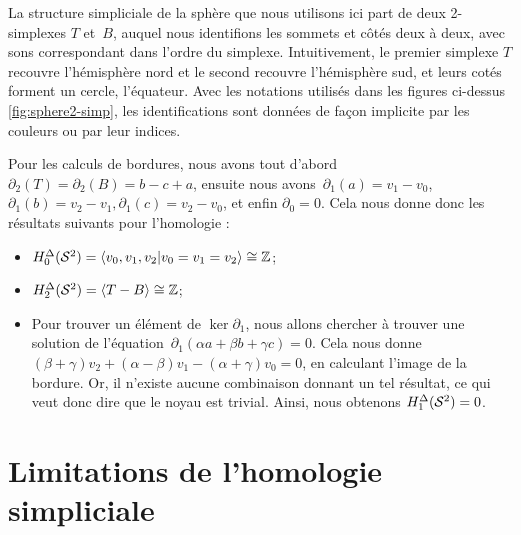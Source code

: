 \begin{exemple}
La structure simpliciale de la sphère que nous utilisons ici part de deux 2-simplexes $T$ et~$B$, auquel nous identifions les sommets et côtés deux à deux, avec sons correspondant dans l'ordre du simplexe. Intuitivement, le premier simplexe $T$ recouvre l'hémisphère nord et le second recouvre l'hémisphère sud, et leurs cotés forment un cercle, l'équateur. Avec les notations utilisés dans les figures ci-dessus \ref{fig:sphere2-simp}, les identifications sont données de façon implicite par les couleurs ou par leur indices.

Pour les calculs de bordures, nous avons tout d'abord $\partial_2(T)=\partial_2(B)=b-c+a$, ensuite nous avons~${\partial_1(a)=v_1-v_0}$, $\partial_1(b)=v_2-v_1,\partial_1(c)=v_2-v_0$, et enfin $\partial_0=0$. Cela nous donne donc les résultats suivants pour l'homologie :
\begin{itemize}
    \item $H^\Delta_0(\mathcal{S}^{2})=\langle v_0,v_1,v_2|v_0=v_1=v_2\rangle\cong\mathbb{Z}$;
    \item $H^\Delta_2(\mathcal{S}^{2})=\langle T-B\rangle\cong\mathbb{Z}$;
    \item Pour trouver un élément de $\ker\partial_1$, nous allons chercher à trouver une solution de l'équation~${\partial_1(\alpha a+\beta b+\gamma c)=0}$. Cela nous donne $(\beta+\gamma)v_2+(\alpha-\beta)v_1-(\alpha+\gamma)v_0=0$, en calculant l'image de la bordure. Or, il n'existe aucune combinaison donnant un tel résultat, ce qui veut donc dire que le noyau est trivial. Ainsi, nous obtenons $H^\Delta_1(\mathcal{S}^{2})=0$.
\end{itemize}
\end{exemple}


\section{Limitations de l'homologie simpliciale}

